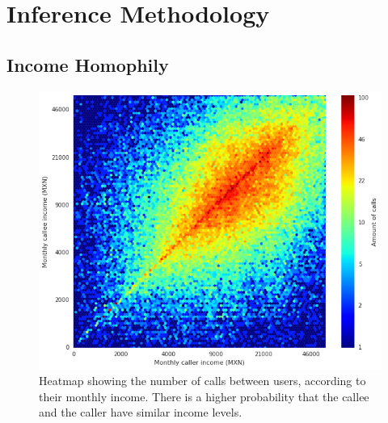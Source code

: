\section{Inference Methodology}
\label{inference_methodology}






\subsection{Income Homophily}

\begin{figure}[h]
\begin{center}
\includegraphics[width=1\columnwidth]{figures/Homophily_income_origin_target_1/Homophily_income_origin_target_1.png}
\caption{Heatmap showing the number of calls between users, according to their monthly income. There is a higher probability that the callee and the caller have similar income levels.}
\label{homophily_heatmap}
\end{center}
\end{figure}

